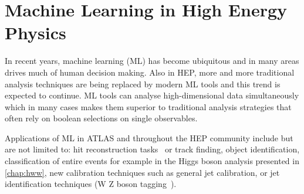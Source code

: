 





\chapter{Machine Learning in High Energy Physics}
\label{chap:ml}

In recent years, machine learning (ML) has become ubiquitous and in many areas drives much of human decision making. 
Also in HEP, more and more traditional analysis techniques are being replaced by modern ML tools and this trend is expected to continue.
ML tools can analyse high-dimensional data simultaneously which in many cases makes them superior to traditional analysis strategies that often rely on boolean selections on single observables. 

Applications of ML in ATLAS and throughout the HEP community include but are not limited to: hit reconstruction tasks~\cite{PERF-2012-05} or track finding, object identification, classification of entire events for example in the Higgs boson analysis presented in \cref{chap:hww}, new calibration techniques such as general jet calibration, or jet identification techniques (W Z boson tagging~\cite{ATL-PHYS-PUB-2021-029}). 


